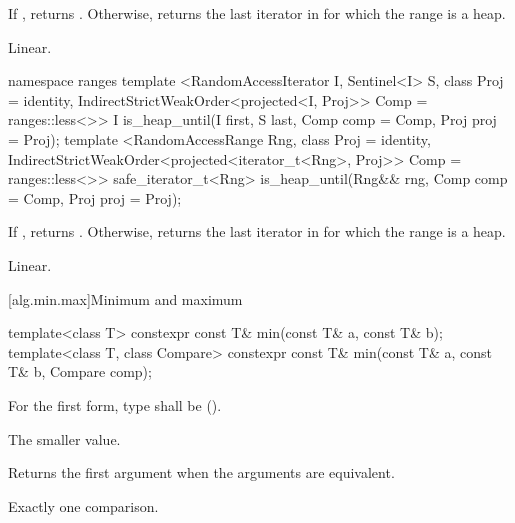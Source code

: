 \begin{itemdescr}
\pnum
\returns If , returns
. Otherwise, returns
the last iterator  in  for which the
range  is a heap.

\pnum
\complexity Linear.
\end{itemdescr}

\begin{addedblock}
%
\begin{itemdecl}
namespace ranges {
  template <RandomAccessIterator I, Sentinel<I> S, class Proj = identity,
            IndirectStrictWeakOrder<projected<I, Proj>> Comp = ranges::less<>>
    I is_heap_until(I first, S last, Comp comp = Comp{}, Proj proj = Proj{});
  template <RandomAccessRange Rng, class Proj = identity,
            IndirectStrictWeakOrder<projected<iterator_t<Rng>, Proj>> Comp = ranges::less<>>
    safe_iterator_t<Rng> is_heap_until(Rng&& rng, Comp comp = Comp{}, Proj proj = Proj{});
}
\end{itemdecl}

\begin{itemdescr}
\pnum
\returns If , returns
. Otherwise, returns
the last iterator  in  for which the
range  is a heap.

\pnum
\complexity Linear.
\end{itemdescr}
\end{addedblock}

[alg.min.max]{Minimum and maximum}

%
\begin{itemdecl}
template<class T> constexpr const T& min(const T& a, const T& b);
template<class T, class Compare>
  constexpr const T& min(const T& a, const T& b, Compare comp);
\end{itemdecl}

\begin{itemdescr}
\pnum
\requires
For the first form, type  shall be
 ().

\pnum
\returns
The smaller value.

\pnum
\remarks
Returns the first argument when the arguments are equivalent.

\pnum
\complexity
Exactly one comparison.
\end{itemdescr}

